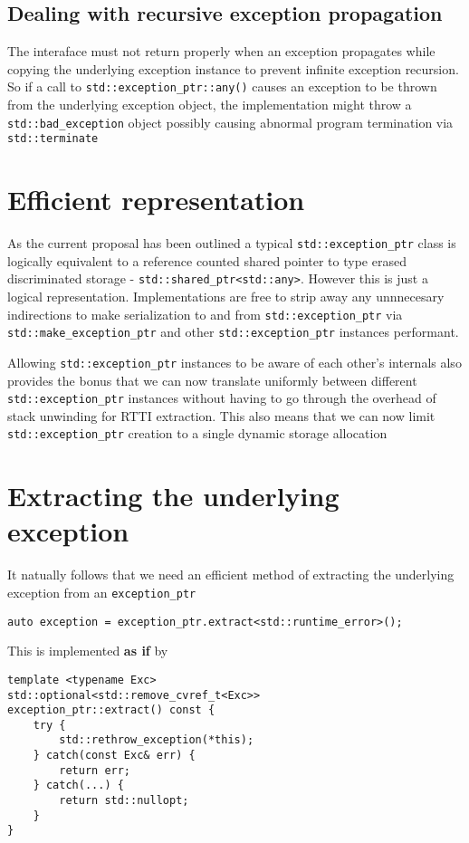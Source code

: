 \documentclass{article}
\begin{document}
\subsection{Dealing with recursive exception propagation}
The interaface must not return properly when an exception propagates while
copying the underlying exception instance to prevent infinite exception
recursion.  So if a call to \texttt{std::exception\_ptr::any()} causes an
exception to be thrown from the underlying exception object, the
implementation might throw a \texttt{std::bad\_exception} object possibly
causing abnormal program termination via \texttt{std::terminate}

\section{Efficient representation}
As the current proposal has been outlined a typical \texttt{std::exception\_ptr}
class is logically equivalent to a reference counted shared pointer to type
erased discriminated storage - \texttt{std::shared\_ptr<std::any>}.  However
this is just a logical representation.  Implementations are free to strip away
any unnnecesary indirections to make serialization to and from
\texttt{std::exception\_ptr} via \texttt{std::make\_exception\_ptr} and other
\texttt{std::exception\_ptr} instances performant.

Allowing \texttt{std::exception\_ptr} instances to be aware of each other's
internals also provides the bonus that we can now translate uniformly between
different \texttt{std::exception\_ptr} instances without having to go through
the overhead of stack unwinding for RTTI extraction.  This also means that we
can now limit \texttt{std::exception\_ptr} creation to a single dynamic
storage allocation

\section{Extracting the underlying exception}
It natually follows that we need an efficient method of extracting the
underlying exception from an \texttt{exception\_ptr}
\begin{lstlisting}
auto exception = exception_ptr.extract<std::runtime_error>();
\end{lstlisting}

This is implemented \textbf{as if} by
\begin{lstlisting}
template <typename Exc>
std::optional<std::remove_cvref_t<Exc>>
exception_ptr::extract() const {
    try {
        std::rethrow_exception(*this);
    } catch(const Exc& err) {
        return err;
    } catch(...) {
        return std::nullopt;
    }
}
\end{lstlisting}
\end{document}
